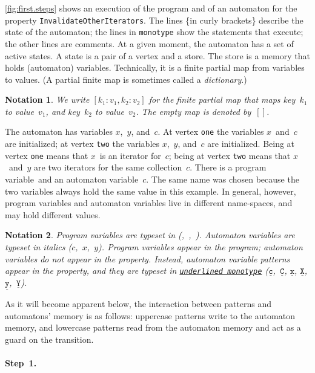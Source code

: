 \documentclass[10pt]{llncs} %
\newcommand{\pattern}[1]{\ensuremath{\mathtt{\underline{#1}}}}
\newtheorem{notation}{Notation}
\begin{document}
\autoref{fig:first.steps} shows an execution of the program and of an automaton for the property \texttt{InvalidateOtherIterators}.
The lines \{in curly brackets\} describe the state of the automaton;
the lines in \texttt{monotype} show the statements that execute;
the other lines are comments.
At a given moment, the automaton has a set of active states.
A state is a pair of a vertex and a store.
The store is a memory that holds (automaton) variables.
Technically, it is a finite partial map from variables to values.
(A partial finite map is sometimes called a \emph{dictionary}.)

\begin{notation}
We write $[k_1:v_1,k_2:v_2]$ for the finite partial map that maps key~$k_1$ to value~$v_1$, and key~$k_2$ to value~$v_2$.
The empty map is denoted by~$[]$.
\end{notation}

The automaton has variables $x$,~$y$, and~$c$.
At vertex \texttt{one} the variables $x$~and~$c$ are initialized;
at vertex \texttt{two} the variables $x$,~$y$, and~$c$ are initialized.
Being at vertex \texttt{one} means that $x$~is an iterator for~$c$;
being at vertex \texttt{two} means that $x$~and~$y$ are two iterators for the same collection~$c$.
There is a program variable~\Verb@c@ and an automaton variable~$c$.
The same name was chosen because the two variables always hold the same value in this example.
In general, however, program variables and automaton variables live in different name-spaces, and may hold different values.

\begin{notation}
Program variables are typeset in \Verb@monotype@ (\Verb@c@,~\Verb@i@,~\Verb@j@).
Automaton variables are typeset in \textit{italics} ($c$,~$x$,~$y$).
Program variables appear in the program;
automaton variables do \emph{not} appear in the property.
Instead, automaton variable \emph{patterns} appear in the property, and they are typeset in \texttt{\underline{underlined monotype}} (\pattern c,~\pattern C, \pattern x, \pattern X, \pattern y,~\pattern Y).
\end{notation}

As it will become apparent below, the interaction between patterns and automatons' memory is as follows: uppercase patterns write to the automaton memory, and lowercase patterns read from the automaton memory and act as a guard on the transition.

\paragraph{Step~1.}
\end{document}
